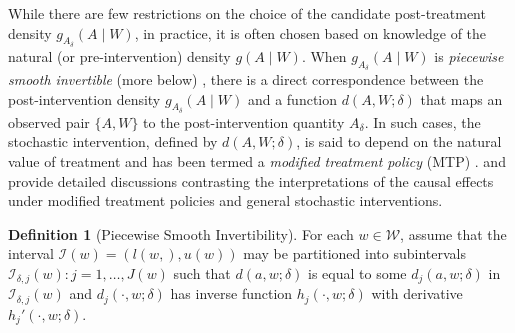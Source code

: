 \documentclass[
  12pt, krantz2,
]{krantz}
\newcommand{\1}{\mathbbm{1}}
\theoremstyle{definition}
\newtheorem{definition}{Definition}[chapter]
\theoremstyle{definition}
\theoremstyle{definition}
\theoremstyle{definition}
\theoremstyle{remark}
\begin{document}
While there are few restrictions on the choice of the candidate post-treatment
density \(g_{A_{\delta}}(A \mid W)\), in practice, it is often chosen based on
knowledge of the natural (or pre-intervention) density \(g(A \mid W)\). When
\(g_{A_{\delta}}(A \mid W)\) is \emph{piecewise smooth invertible} (more below)
\citep{haneuse2013estimation}, there is a direct correspondence between the
post-intervention density \(g_{A_{\delta}}(A \mid W)\) and a function \(d(A, W; \delta)\) that maps an observed pair \(\{A, W\}\) to the post-intervention quantity
\(A_{\delta}\). In such cases, the stochastic intervention, defined by \(d(A, W; \delta)\), is said to depend on the natural value of treatment and has been
termed a \emph{modified treatment policy} (MTP) \citep{haneuse2013estimation, diaz2018stochastic, hejazi2021semiparametric}. \citet{haneuse2013estimation} and
\citet{young2014identification} provide detailed discussions contrasting the
interpretations of the causal effects under modified treatment policies and
general stochastic interventions.

\begin{definition}[Piecewise Smooth Invertibility]
For each \(w \in \mathcal{W}\), assume that the interval \(\mathcal{I}(w) = (l(w,), u(w))\) may be partitioned into subintervals \(\mathcal{I}_{\delta,j}(w): j = 1, \ldots, J(w)\) such that \(d(a, w; \delta)\) is equal to some \(d_j(a, w; \delta)\) in \(\mathcal{I}_{\delta,j}(w)\) and \(d_j(\cdot,w; \delta)\) has inverse
function \(h_j(\cdot, w; \delta)\) with derivative \(h_j'(\cdot, w; \delta)\).
\end{definition}
\end{document}
